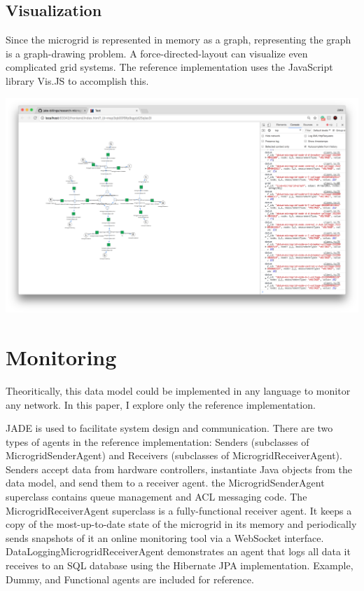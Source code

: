 \documentclass{article}
\begin{document}
\subsection{Visualization}
Since the microgrid is represented in memory as a graph, representing the graph is a graph-drawing problem. A force-directed-layout can visualize even complicated grid systems. The reference implementation uses the JavaScript library Vis.JS to accomplish this.

\includegraphics[width=\textwidth]{screenshots/preliminaryGraphRendering.png}

\section{Monitoring}
Theoritically, this data model could be implemented in any language to monitor any network. In this paper, I explore only the reference implementation.

JADE is used to facilitate system design and communication. There are two types of agents in the reference implementation: Senders (subclasses of MicrogridSenderAgent) and Receivers (subclasses of MicrogridReceiverAgent). Senders accept data from hardware controllers, instantiate Java objects from the data model, and send them to a receiver agent. the MicrogridSenderAgent superclass contains queue management and ACL messaging code. The MicrogridReceiverAgent superclass is a fully-functional receiver agent. It keeps a copy of the most-up-to-date state of the microgrid in its memory and periodically sends snapshots of it an online monitoring tool via a WebSocket interface. DataLoggingMicrogridReceiverAgent demonstrates an agent that logs all data it receives to an SQL database using the Hibernate JPA implementation. Example, Dummy, and Functional agents are included for reference.
\end{document}
